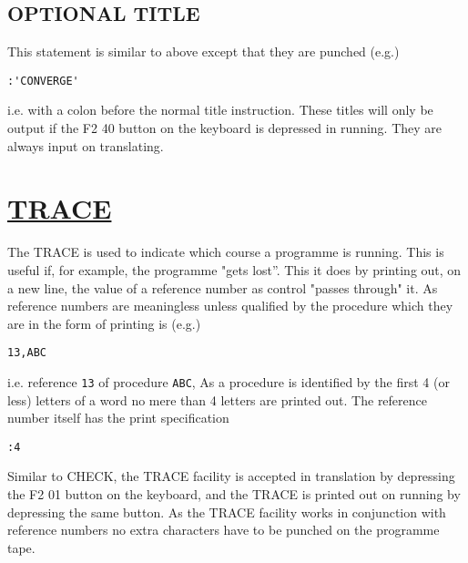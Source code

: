 \documentclass[10pt, a4paper, oneside]{article}
\newcommand{\myuline}[1]{\uline{#1}}
\newcommand{\mytt}[1]{\texttt{\scriptsize #1}}
\newcommand{\mytt}[1]{\texttt{\small #1}}
\begin{document}
\begin{multicols}{2}
\subsection{OPTIONAL TITLE}

This statement is similar to above except that
they are punched (e.g.)

\begin{addmargin}[1cm]{1em}%
\begin{lstlisting}
:'CONVERGE'
\end{lstlisting}
\end{addmargin}

i.e. with a colon before the normal title instruction.
These titles will only be output if the F2 40 button on
the keyboard is depressed in running.  They are always
input on translating.


\section{\myuline{TRACE}}

The TRACE is used to indicate which course a
programme is running.  This is useful if, for example,
the programme "gets lost”.  This it does by printing
out, on a new line, the value of a reference number
as control "passes through" it.  As reference numbers
are meaningless unless qualified by the procedure
which they are in the form of printing is (e.g.)

\begin{addmargin}[1cm]{1em}%
\begin{lstlisting}
13,ABC
\end{lstlisting}
\end{addmargin}

\begin{flushleft}
i.e. reference \mytt{13} of procedure \mytt{ABC}, As a procedure is
identified by the first 4 (or less) letters of a word
no mere than 4 letters are printed out.  The reference
number itself has the print specification
\end{flushleft}

\begin{addmargin}[1cm]{1em}%
\begin{lstlisting}
:4
\end{lstlisting}
\end{addmargin}

Similar to CHECK, the TRACE facility is accepted
in translation by depressing the F2 01 button on the
keyboard, and the TRACE is printed out on running by
depressing the same button.  As the TRACE facility
works in conjunction with reference numbers no extra
characters have to be punched on the programme tape.


\end{multicols}
\end{document}
